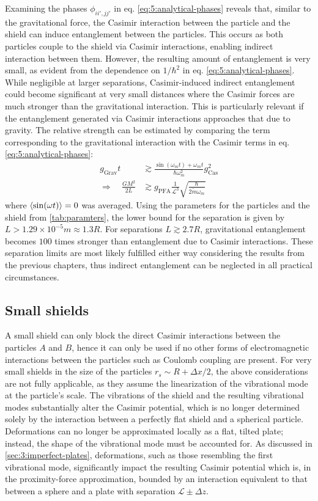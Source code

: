 Examining the phases $\phi_{ii',jj'}$ in eq. \eqref{eq:5:analytical-phases} reveals that, similar to the gravitational force, the Casimir interaction between the particle and the shield can induce entanglement between the particles. This occurs as both particles couple to the shield via Casimir interactions, enabling indirect interaction between them.
However, the resulting amount of entanglement is very small, as evident from the dependence on $1/\hbar^2$ in eq. \eqref{eq:5:analytical-phases}.
While negligible at larger separations, Casimir-induced indirect entanglement could become significant at very small distances where the Casimir forces are much stronger than the gravitational interaction. 
This is particularly relevant if the entanglement generated via Casimir interactions approaches that due to gravity. 
The relative strength can be estimated by comparing the term corresponding to the gravitational interaction with the Casimir terms in eq. \eqref{eq:5:analytical-phases}:
\begin{align}
  g_\mathrm{Grav} t &\gtrsim \frac{\sin(\omega_m t) + \omega_m t}{\hbar \omega_m^2} g_\mathrm{Cas}^2 \\
  \Longrightarrow \quad 
  \frac{G M^2}{2L} &\gtrsim g_\mathrm{PFA} \frac{1}{\mathscr{L}^3} \sqrt{\frac{\hbar}{2\tilde{m}\omega_m}}
\end{align}
where $\left\langle\sin(\omega t)\right\rangle = 0$ was averaged.
Using the parameters for the particles and the shield from \cref{tab:paramters}, the lower bound for the separation is given by $L > 1.29\times 10^{-5}\si{m}\approx 1.3 R$. For separations $L \gtrsim 2.7R$, gravitational entanglement becomes $100$ times stronger than entanglement due to Casimir interactions.
These separation limits are most likely fulfilled either way considering the results from the previous chapters, thus indirect entanglement can be neglected in all practical circumstances.



\subsection{Small shields}
A small shield can only block the direct Casimir interactions between the particles $A$ and $B$, hence it can only be used if no other forms of electromagnetic interactions between the particles such as Coulomb coupling are present.
For very small shields in the size of the particles $r_s \sim R + \Delta x / 2$, the above considerations are not fully applicable, as they assume the linearization of the vibrational mode at the particle's scale.
The vibrations of the shield and the resulting vibrational modes substantially alter the Casimir potential, which is no longer determined solely by the interaction between a perfectly flat shield and a spherical particle. 
Deformations can no longer be approximated locally as a flat, tilted plate; instead, the shape of the vibrational mode must be accounted for. 
As discussed in \cref{sec:3:imperfect-plates}, deformations, such as those resembling the first vibrational mode, significantly impact the resulting Casimir potential which is, in the proximity-force approximation, bounded by an interaction equivalent to that between a sphere and a plate with separation $\mathscr{L} \pm \Delta z$.

